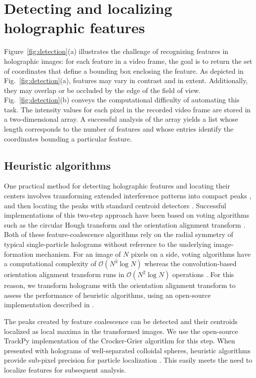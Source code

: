 \section{Detecting and localizing holographic features}

Figure~\ref{fig:detection}(a) illustrates the challenge of
recognizing features in holographic images: for each
feature in a video frame, the goal is to return the set of coordinates
that define a bounding box enclosing the feature. As depicted
in Fig.~\ref{fig:detection}(a), features may vary in
contrast and in extent. Additionally, they may overlap or be occluded by
the edge of the field of view. Fig.~\ref{fig:detection}(b) conveys the computational
difficulty of automating this task. The intensity values
for each pixel in the recorded video frame are stored in a two-dimensional
array. A successful analysis of the
array yields a list whose length corresponds to the number of features and whose
entries identify the coordinates bounding a particular feature.
  
\subsection{Heuristic algorithms}
\label{sec:heuristic}

One practical method for detecting holographic features and 
locating their centers involves transforming extended interference
patterns into compact peaks \cite{cheong09,krishnatreya14a}, and 
then locating the peaks with standard centroid detectors 
\cite{crocker96,allan16trackpy}. 
Successful implementations of this two-step
approach have been based on
voting algorithms such as the circular Hough transform
\cite{cheong09,parthasarathy12,allan16trackpy} and
the orientation alignment transform \cite{krishnatreya14a}.
Both of these feature-coalescence algorithms rely on the
radial symmetry of typical single-particle holograms
without reference to the underlying image-formation
mechanism.
For an image of $N$ pixels on a side, voting algorithms
have a computational complexity of $\mathcal{O}\left (N^3 \log N \right )$ 
\cite{hollitt13} whereas the convolution-based orientation alignment
transform
runs in $\mathcal{O}\left ( N^2 \log N \right )$ operations \cite{cheong09}.
For this reason, we transform holograms with the
orientation alignment transform
to assess the performance of heuristic algorithms,
using an open-source implementation described
in \cite{cheong09}.

The peaks created by feature coalescence can be detected
and their centroids localized as local maxima in the transformed images.
We use the open-source
TrackPy implementation \cite{allan16trackpy}
of the Crocker-Grier algorithm \cite{crocker96} for this step.
When presented with holograms of well-separated
colloidal spheres, heuristic algorithms provide
sub-pixel precision for particle localization
\cite{cheong09,krishnatreya14a}.
This easily meets the need to localize
features for subsequent analysis.

